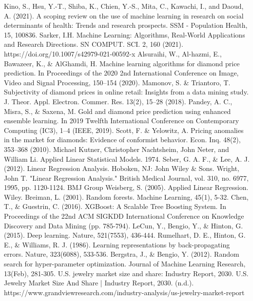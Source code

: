 \documentclass[conference]{IEEEtran}
\begin{document}
\newpage
\begin{thebibliography}{00}
 Kino, S., Hsu, Y.-T., Shiba, K., Chien, Y.-S., Mita, C., Kawachi, I., and Daoud, A. (2021). A scoping review on the use of machine learning in research on social determinants of health: Trends and research prospects. SSM - Population Health, 15, 100836.
 Sarker, I.H. Machine Learning: Algorithms, Real-World Applications and Research Directions. SN COMPUT. SCI. 2, 160 (2021). https://doi.org/10.1007/s42979-021-00592-x
 Alsuraihi, W., Al-hazmi, E., Bawazeer, K., \& AlGhamdi, H. Machine learning algorithms for diamond price prediction. In Proceedings of the 2020 2nd International Conference on Image, Video and Signal Processing, 150–154 (2020).
 Mamonov, S. \& Triantoro, T. Subjectivity of diamond prices in online retail: Insights from a data mining study. J. Theor. Appl. Electron. Commer. Res. 13(2), 15–28 (2018).
 Pandey, A. C., Misra, S., \& Saxena, M. Gold and diamond price prediction using enhanced ensemble learning. In 2019 Twelfth International Conference on Contemporary Computing (IC3), 1–4 (IEEE, 2019).
 Scott, F. \& Yelowitz, A. Pricing anomalies in the market for diamonds: Evidence of conformist behavior. Econ. Inq. 48(2), 353–368 (2010).
Michael Kutner, Christopher Nachtsheim, John Neter, and William Li. Applied Linear Statistical Models. 1974.
Seber, G. A. F., \& Lee, A. J. (2012). Linear Regression Analysis. Hoboken, NJ: John Wiley \& Sons.
 Wright, John T. "Linear Regression Analysis." British Medical Journal, vol. 310, no. 6977, 1995, pp. 1120-1124. BMJ Group
 Weisberg, S. (2005). Applied Linear Regression. Wiley.
 Breiman, L. (2001). Random forests. Machine Learning, 45(1), 5-32.
 Chen, T., \& Guestrin, C. (2016). XGBoost: A Scalable Tree Boosting System. In Proceedings of the 22nd ACM SIGKDD International Conference on Knowledge Discovery and Data Mining (pp. 785-794).
 LeCun, Y., Bengio, Y., \& Hinton, G. (2015). Deep learning. Nature, 521(7553), 436-444.
 Rumelhart, D. E., Hinton, G. E., \& Williams, R. J. (1986). Learning representations by back-propagating errors. Nature, 323(6088), 533-536.
 Bergstra, J., \& Bengio, Y. (2012). Random search for hyper-parameter optimization. Journal of Machine Learning Research, 13(Feb), 281-305.
 U.S. jewelry market size and share: Industry Report, 2030. U.S. Jewelry Market Size And Share | Industry Report, 2030. (n.d.). https://www.grandviewresearch.com/industry-analysis/us-jewelry-market-report

\end{thebibliography}
\end{document}
